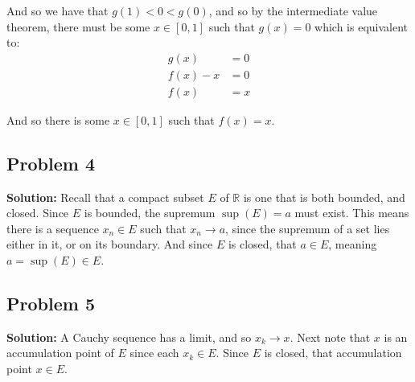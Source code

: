 \documentclass{article}
\newcommand{\R}{\mathbb R}
\begin{document}
And so we have that $g(1)<0<g(0)$, and so by the intermediate value theorem, there must be some $x\in[0,1]$ such that $g(x)=0$ which is equivalent to:
\begin{align*}
  g(x)&=0\\
  f(x)-x&=0\tag{def. of $g$}\\
  f(x)&=x
\end{align*}

And so there is some $x\in[0,1]$ such that $f(x)=x$.

\subsection*{Problem 4}
\noindent\textbf{Solution:} Recall that a compact subset $E$ of $\R$ is one that is both bounded, and closed. Since $E$ is bounded, the supremum $\sup(E)=a$ must exist. This means there is a sequence $x_n\in E$ such that $x_n\to a$, since the supremum of a set lies either in it, or on its boundary. And since $E$ is closed, that $a\in E$, meaning $a=\sup(E)\in E$.

\subsection*{Problem 5}
\noindent\textbf{Solution:} A Cauchy sequence has a limit, and so $x_k\to x$. Next note that $x$ is an accumulation point of $E$ since each $x_k\in E$. Since $E$ is closed, that accumulation point $x\in E$.
\end{document}
